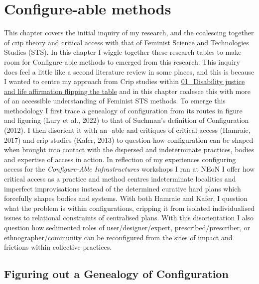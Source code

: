 \hypertarget{configure-able-methods}{%
\section[Configure-able
methods]{\texorpdfstring{\protect\hypertarget{anchor}{}{}Configure-able
methods}{Configure-able methods}}\label{configure-able-methods}}

This chapter covers the initial inquiry of my research, and the
coalescing together of crip theory and critical access with that of
Feminist Science and Technologies Studies (STS). In this chapter I
wiggle together these research tables to make room for Configure-able
methods to emerged from this research. This inquiry does feel a little
like a second literature review in some places, and this is because I
wanted to centre my approach from Crip studies within
\href{../../01_Disability_justice_and_life_affirmation_flipping_the_table/01_Disability\%20justice\%20and\%20life\%20affirmation\%20flipping\%20the\%20table.md}{01\_Disability
justice and life affirmation flipping the table} and in this chapter
coalesce this with more of an accessible understanding of Feminist STS
methods. To emerge this methodology I first trace a genealogy of
configuration from its routes in figure and figuring (Lury et al., 2022)
to that of Suchman's definition of Configuration (2012). I then
disorient it with an -able and critiques of critical access (Hamraie,
2017) and crip studies (Kafer, 2013) to question how configuration can
be shaped when brought into contact with the dispersed and indeterminate
practices, bodies and expertise of access in action. In reflection of my
experiences configuring access for the \emph{Configure-Able
Infrastructures} workshops I ran at NEoN I offer how critical access as
a practice and method centres indeterminate localities and imperfect
improvisations instead of the determined curative hard plans which
forcefully shapes bodies and systems. With both Hamraie and Kafer, I
question what the problem is within configurations, cripping it from
isolated individualised issues to relational constraints of centralised
plans. With this disorientation I also question how sedimented roles of
user/designer/expert, prescribed/prescriber, or ethnographer/community
can be reconfigured from the sites of impact and frictions within
collective practices.

\hypertarget{figuring-out-a-genealogy-of-configuration}{%
\subsection[Figuring out a Genealogy of
Configuration]{\texorpdfstring{\protect\hypertarget{anchor}{}{}Figuring
out a Genealogy of
Configuration}{Figuring out a Genealogy of Configuration}}\label{figuring-out-a-genealogy-of-configuration}}

